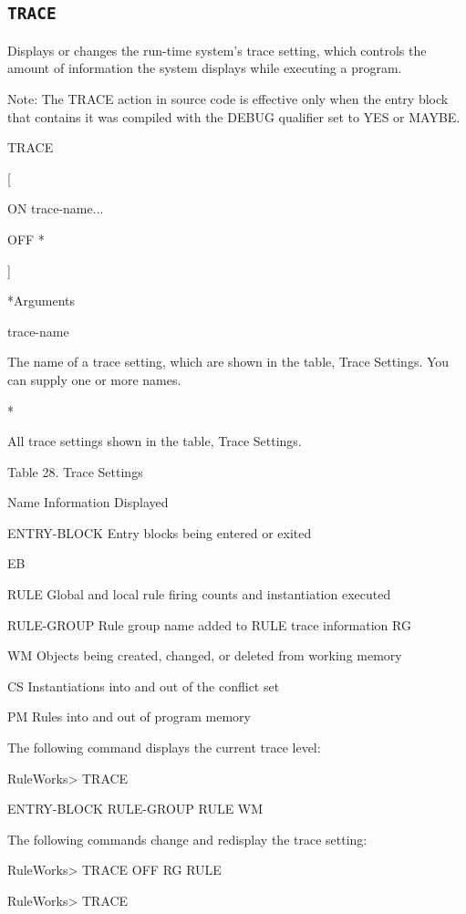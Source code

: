 {{\subsection{\tt{TRACE}}

Displays or changes the run-time system's trace setting,
which controls the amount of information the system displays
while executing a program.

Note: The TRACE action in source code is effective only when the entry
block that contains it was compiled with the DEBUG qualifier set to
YES or MAYBE.

\Format

TRACE

[

ON trace-name...

OFF *

]

*Arguments

trace-name

The name of a trace setting, which are shown in the table,
Trace Settings. You can supply one or more names.

*

All trace settings shown in the table, Trace Settings.

Table 28. Trace Settings

Name  Information Displayed

{ENTRY-BLOCK}  Entry blocks being entered or exited

{EB}

RULE  Global and local rule firing counts and instantiation
executed

{RULE-GROUP} Rule group name added to RULE trace information
{RG}

WM  Objects being created, changed, or deleted from working
memory

CS  Instantiations into and out of the conflict set

PM  Rules into and out of program memory





\Example

The following command displays the current trace level:

RuleWorks> TRACE

ENTRY-BLOCK RULE-GROUP RULE WM

The following commands change and redisplay the trace
setting:

RuleWorks> TRACE OFF RG RULE

RuleWorks> TRACE

}}
